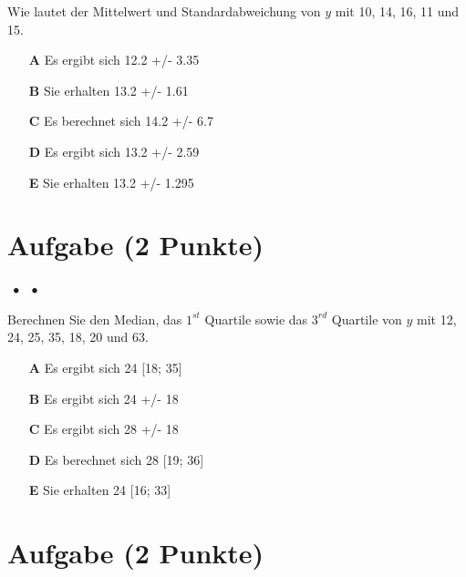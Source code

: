 \documentclass[a4paper, 9pt]{scrartcl}\usepackage[]{graphicx}\usepackage[]{xcolor}
\begin{document}
Wie lautet der Mittelwert und Standardabweichung von $y$ mit 10, 14, 16, 11 und 15.



\begin{enumerate}
\item [\textbf{A} \msquare] Es ergibt sich 12.2 +/- 3.35
\item [\textbf{B} \msquare] Sie erhalten 13.2 +/- 1.61
\item [\textbf{C} \msquare] Es berechnet sich 14.2 +/- 6.7
\item [\textbf{D} \msquare] Es ergibt sich 13.2 +/- 2.59
\item [\textbf{E} \msquare] Sie erhalten 13.2 +/- 1.295
\end{enumerate} 

\section{Aufgabe \hfill (2 Punkte)}

\ifcollection
\begin{flushright}
\tiny\vspace{-2Ex}
\textbf{\examinhaltstart}
\exammodulemathstat $\;\bullet$
\exammodulestat $\;\bullet$
\exammodulestatbbv 
\vspace{-1Ex}
\end{flushright}
\fi




Berechnen Sie den Median, das $1^{st}$ Quartile sowie das $3^{rd}$ Quartile von $y$ mit 12, 24, 25, 35, 18, 20 und 63.




\begin{enumerate}
\item [\textbf{A} \msquare] Es ergibt sich 24 [18; 35]
\item [\textbf{B} \msquare] Es ergibt sich 24 +/- 18
\item [\textbf{C} \msquare] Es ergibt sich 28 +/- 18
\item [\textbf{D} \msquare] Es berechnet sich 28 [19; 36]
\item [\textbf{E} \msquare] Sie erhalten 24 [16; 33]
\end{enumerate} 

\section{Aufgabe \hfill (2 Punkte)}
\end{document}
